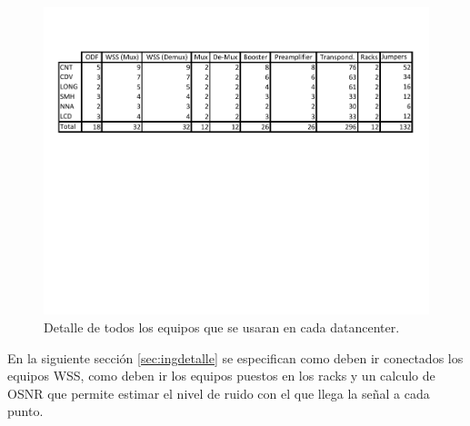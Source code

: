 \begin{figure}[H]
  \centering
  \includegraphics[width=14cm]{Imagenes/equipos.pdf}
  \caption[Total de Equipos necesarios]{Detalle de todos los equipos que se usaran en cada datancenter.}
  \label{fig:resumen}
\end{figure}

En la siguiente sección \ref{sec:ingdetalle} se especifican como deben ir conectados los equipos WSS, como deben ir los equipos puestos en los racks y un calculo de OSNR que permite estimar el nivel de ruido con el que llega la señal a cada punto.
